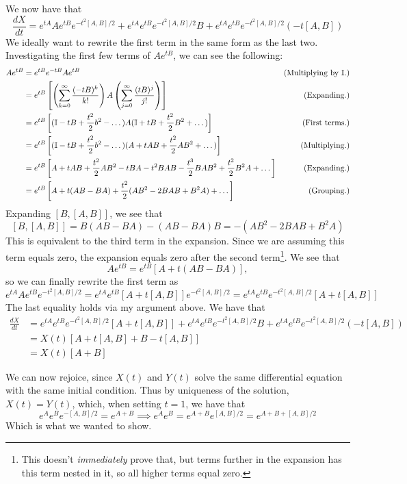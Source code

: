 \begin{solution}
    We now have that 
    \[\frac{dX}{dt} =  e^{tA}Ae^{tB}e^{-t^2[A, B]/2} + e^{tA}e^{tB}e^{-t^2[A, B]/2}B + e^{tA}e^{tB}e^{-t^2[A, B]/2}(-t[A, B])\]
    We ideally want to rewrite the first term in the same form as the last two. Investigating the first few terms of $Ae^{tB}$, we can see the following:
    \tightalignbreak
    \begin{align*}
        Ae^{tB} &= e^{tB}e^{-tB}Ae^{tB} &\text{(Multiplying by $\mathbb{I}$.)}\\
        &= e^{tB}\left[\left( \sum_{k = 0}^\infty \frac{(-tB)^k}{k!}\right) A \left( \sum_{j = 0}^\infty \frac{(tB)^j}{j!}\right)\right] &\text{(Expanding.)}\\
        &= e^{tB}\left[ (\mathbb{I} - tB + \frac{t^2}{2}b^2 - \dots)A(\mathbb{I} + tB + \frac{t^2}{2}B^2 + \dots)\right] &\text{(First terms.)}\\
        &= e^{tB}\left[ (\mathbb{I} - tB + \frac{t^2}{2}b^2 - \dots) (A + tAB + \frac{t^2}{2} AB^2 + \dots)\right] &\text{(Multiplying.)}\\
        &= e^{tB}\left[ A + tAB + \frac{t^2}{2}AB^2 - tBA - t^2BAB - \frac{t^3}{2}BAB^2 + \frac{t^2}{2}B^2A + \dots\right] &\text{(Expanding.)}\\
        &= e^{tB}\left[ A + t(AB - BA) + \frac{t^2}{2}(AB^2 - 2BAB + B^2A) + \dots\right] &\text{(Grouping.)}
    \end{align*}
    \vspace{-6mm}\alignbreak
    Expanding $[B, [A, B]]$, we see that 
    \[[B, [A, B]] = B(AB - BA) - (AB - BA)B = -(AB^2 - 2BAB + B^2A)\]
    This is equivalent to the third term in the expansion. Since we are assuming this term equals zero, the expansion equals zero after the second term\footnote{This doesn't \textit{immediately} prove that, but terms further in the expansion has this term nested in it, so all higher terms equal zero.}. We see that 
    \[Ae^{tB} = e^{tB}\left[ A + t(AB - BA)\right],\]
    so we can finally rewrite the first term as 
    \[e^{tA}Ae^{tB}e^{-t^2[A, B]/2} = e^{tA}e^{tB}\left[ A + t[A, B]\right]e^{-t^2[A, B]/2} = e^{tA}e^{tB}e^{-t^2[A, B]/2}\left[ A + t[A, B]\right]\]
    The last equality holds via my argument above. We have that 
    \begin{align*}
      \frac{dX}{dt} &= e^{tA}e^{tB}e^{-t^2[A, B]/2}\left[ A + t[A, B]\right] + e^{tA}e^{tB}e^{-t^2[A, B]/2}B + e^{tA}e^{tB}e^{-t^2[A, B]/2}(-t[A, B])\\
      &= X(t) \left[ A + t[A, B] + B - t[A, B]\right]\\
      &= X(t) \left[ A + B\right]
    \end{align*}
    \newpage

    We can now rejoice, since $X(t)$ and $Y(t)$ solve the same differential equation with the same initial condition. Thus by uniqueness of the solution, $X(t) = Y(t)$, which, when setting $t = 1$, we have that 
    \[e^{A}e^{B}e^{-[A, B]/2} = e^{A + B} \implies e^{A}e^{B} = e^{A + B}e^{[A, B]/2} = e^{A + B + [A, B]/2}\]
    Which is what we wanted to show.
\end{solution}
